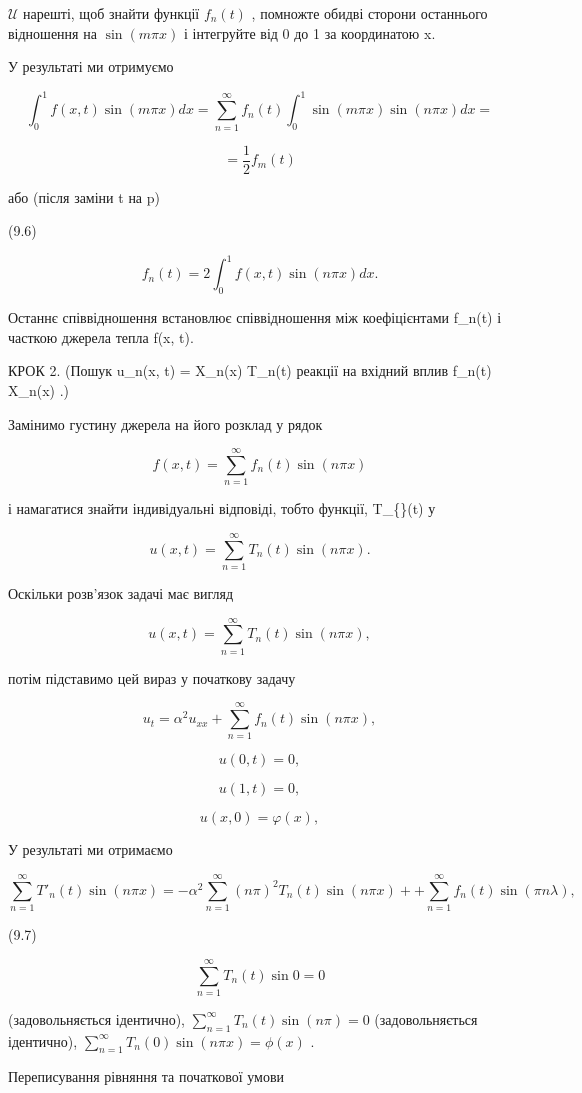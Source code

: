 \documentclass[
  ukrainian,
]{article}
\begin{document}
\(\mathcal{U}\) нарешті, щоб знайти функції \(f_n(t)\) , помножте обидві
сторони останнього відношення на \(\sin(m\pi x)\) і інтегруйте від 0 до
1 за координатою x.

У результаті ми отримуємо

\[
\int_{0}^{1} f(x, t) \sin(m\pi x) dx = \sum_{n=1}^{\infty} f_{n}(t) \int_{0}^{1} \sin(m\pi x) \sin(n\pi x) dx =
\]

\[
= \frac{1}{2} f_{m}(t)
\]

або (після заміни t на p)

(9.6)

\[
f_{n}(t) = 2 \int_{0}^{1} f(x, t) \sin(n\pi x) dx.
\]

Останнє співвідношення встановлює співвідношення між коефіцієнтами
f\_n(t) і часткою джерела тепла f(x, t).

КРОК 2. (Пошук u\_n(x, t) = X\_n(x) T\_n(t) реакції на вхідний вплив
f\_n(t) X\_n(x) .)

Замінимо густину джерела на його розклад у рядок

\[
f(x, t) = \sum_{n=1}^{\infty} f_n(t) \sin(n\pi x)
\]

і намагатися знайти індивідуальні відповіді, тобто функції,
T\_\{\}(t) у

\[
u(x, t) = \sum_{n=1}^{\infty} T_n(t) \sin(n\pi x).
\]

Оскільки розв'язок задачі має вигляд

\[
u(x, t) = \sum_{n=1}^{\infty} T_n(t) \sin(n\pi x),
\]

потім підставимо цей вираз у початкову задачу

\[
u_{t} = \alpha^{2} u_{xx} + \sum_{n=1}^{\infty} f_{n}(t) \sin(n\pi x),
\]

\[
u(0, t) = 0,
\]

\[
u(1, t) = 0,
\]

\[
u(x, 0) = \varphi(x),
\]

У результаті ми отримаємо

\[
\sum_{n=1}^{\infty} T'_n(t) \sin(n\pi x) = -\alpha^2 \sum_{n=1}^{\infty} (n\pi)^2 T_n(t) \sin(n\pi x) + + \sum_{n=1}^{\infty} f_n(t) \sin(\pi n\lambda),
\]

(9.7)

\[
\sum_{n=1}^{\infty} T_n(t) \sin 0 = 0
\]

(задовольняється ідентично),
\(\sum_{n=1}^{\infty} T_n(t) \sin (n\pi) = 0\) (задовольняється
ідентично), \(\sum_{n=1}^{\infty} T_n(0) \sin (n\pi x) = \phi(x)\) .

Переписування рівняння та початкової умови
\end{document}

